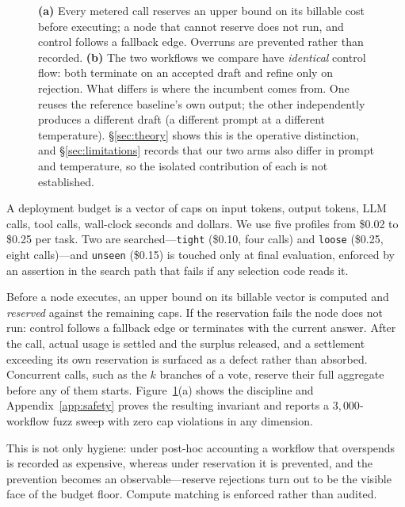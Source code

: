 \documentclass{article}
\begin{document}
\begin{figure}[t]
\begin{minipage}[b]{0.56\textwidth}
\end{minipage}
\caption{\textbf{(a)} Every metered call reserves an upper bound on its billable
cost before executing; a node that cannot reserve does not run, and control
follows a fallback edge. Overruns are prevented rather than recorded.
\textbf{(b)} The two workflows we compare have \emph{identical} control flow:
both terminate on an accepted draft and refine only on rejection. What differs
is where the incumbent comes from. One reuses the reference baseline's own
output; the other independently produces a different draft (a different prompt
at a different temperature). \S\ref{sec:theory} shows this is the operative
distinction, and \S\ref{sec:limitations} records that our two arms also differ
in prompt and temperature, so the isolated contribution of each is not
established.}
\label{fig:mechanism}
\end{figure}

A deployment budget is a vector of caps on input tokens, output tokens, LLM
calls, tool calls, wall-clock seconds and dollars. We use five profiles from
\$0.02 to \$0.25 per task. Two are searched---\texttt{tight} (\$0.10, four
calls) and \texttt{loose} (\$0.25, eight calls)---and \texttt{unseen} (\$0.15)
is touched only at final evaluation, enforced by an assertion in the search path
that fails if any selection code reads it.

Before a node executes, an upper bound on its billable vector is computed and
\emph{reserved} against the remaining caps. If the reservation fails the node
does not run: control follows a fallback edge or terminates with the current
answer. After the call, actual usage is settled and the surplus released, and a
settlement exceeding its own reservation is surfaced as a defect rather than
absorbed. Concurrent calls, such as the $k$ branches of a vote, reserve their
full aggregate before any of them starts. Figure~\ref{fig:mechanism}(a) shows the discipline and
Appendix~\ref{app:safety} proves the resulting invariant and reports a $3{,}000$-workflow fuzz sweep with
zero cap violations in any dimension.

This is not only hygiene: under post-hoc accounting a workflow that overspends
is recorded as expensive, whereas under reservation it is prevented, and the
prevention becomes an observable---reserve rejections turn out to be the visible
face of the budget floor. Compute matching is enforced rather than audited.
\end{document}
